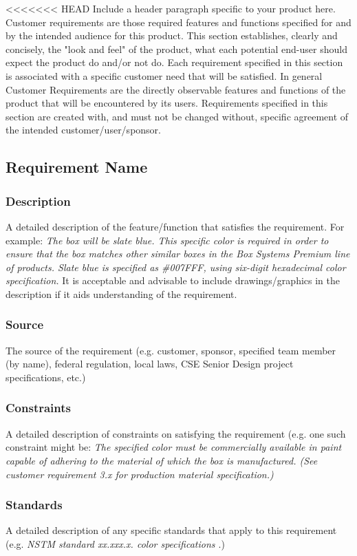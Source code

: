 <<<<<<< HEAD
Include a header paragraph specific to your product here. Customer requirements are those required features and functions specified for and by the intended audience for this product. This section establishes, clearly and concisely, the "look and feel" of the product, what each potential end-user should expect the product do and/or not do. Each requirement specified in this section is associated with a specific customer need that will be satisfied. In general Customer Requirements are the directly observable features and functions of the product that will be encountered by its users. Requirements specified in this section are created with, and must not be changed without, specific agreement of the intended customer/user/sponsor.

\subsection{Requirement Name}
\subsubsection{Description}
A detailed description of the feature/function that satisfies the requirement. For example: \textit{The box will be slate blue. This specific color is required in order to ensure that the box matches other similar boxes in the Box Systems Premium line of products. Slate blue is specified as \#007FFF, using six-digit hexadecimal color specification.} It is acceptable and advisable to include drawings/graphics in the description if it aids understanding of the requirement.
\subsubsection{Source}
The source of the requirement (e.g. customer, sponsor, specified team member (by name), federal regulation, local laws, CSE Senior Design project specifications, etc.)
\subsubsection{Constraints}
A detailed description of constraints on satisfying the requirement (e.g. one such constraint might be: \textit{The specified color must be commercially available in paint capable of adhering to the material of which the box is manufactured. (See customer requirement 3.x for production material specification.)}
\subsubsection{Standards}
A detailed description of any specific standards that apply to this requirement (e.g. \textit{NSTM standard xx.xxx.x. color specifications \cite{Rubin2012}}.)
